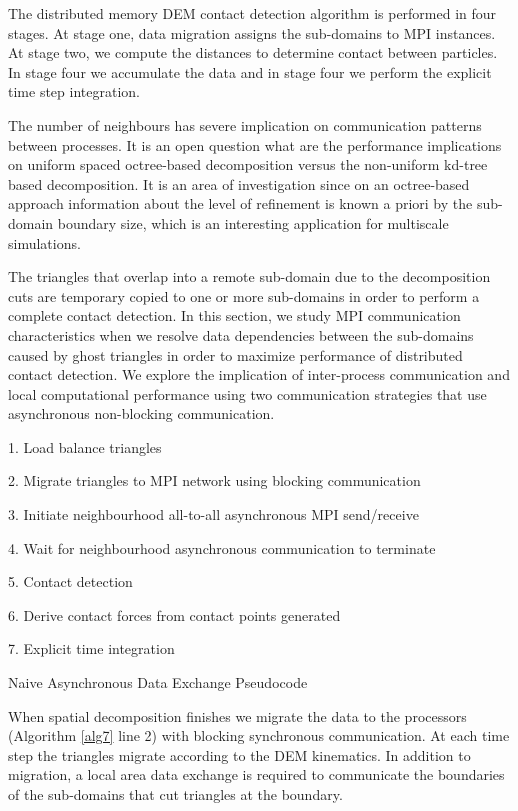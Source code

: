 \documentclass[times,12pt]{article}
\begin{document}
The distributed memory DEM contact detection algorithm is performed in four stages. At stage one, data migration assigns the sub-domains to MPI instances. At stage two, we compute the distances to determine contact between particles. In stage four we accumulate the data and in stage four we perform the explicit time step integration.

The number of neighbours has severe implication on communication patterns between processes. It is an open question what are the performance implications on uniform spaced octree-based decomposition versus the non-uniform kd-tree based decomposition. It is an area of investigation since on an octree-based approach information about the level of refinement is known a priori by the sub-domain boundary size, which is an interesting application for multiscale simulations. 

\label{Unstructured Domain Decomposition}

The triangles that overlap into a remote sub-domain due to the decomposition cuts are temporary copied to one or more sub-domains in order to perform a complete contact detection. In this section, we study MPI communication characteristics when we resolve data dependencies between the sub-domains caused by ghost triangles in order to maximize performance of distributed contact detection. We explore the implication of inter-process communication and local computational performance using two communication strategies that use asynchronous non-blocking communication.

\begin{algorithm}
1. Load balance triangles

2. Migrate triangles to MPI network using blocking communication

3. Initiate neighbourhood all-to-all asynchronous MPI send/receive

4. Wait for neighbourhood asynchronous communication to terminate

5. Contact detection 

6. Derive contact forces from contact points generated

7. Explicit time integration

\protect\caption{\label{alg7}Naive Asynchronous Data Exchange Pseudocode}
\end{algorithm}


When spatial decomposition finishes we migrate the data to the processors (Algorithm \ref{alg7} line 2) with blocking synchronous communication. At each time step the triangles migrate according to the DEM kinematics. In addition to migration, a local area data exchange is required to communicate the boundaries of the sub-domains that cut triangles at the boundary. 
\end{document}

